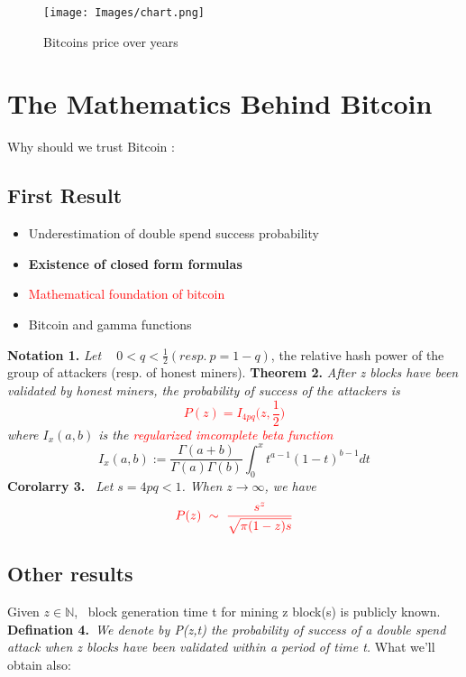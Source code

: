 \documentclass{article}
\begin{document}
    \begin{figure}[h]
        \centering
        \texttt{[image: Images/chart.png]}
        \caption{Bitcoins price over years}
    \end{figure}
    
\section{The Mathematics Behind Bitcoin}
Why should we trust Bitcoin :
    \subsection{First Result}
        \begin{itemize}
            \item Underestimation of double spend success probability
            \item \textbf{Existence of closed form formulas}
            \item \textcolor{red}{Mathematical foundation of bitcoin}
            \item Bitcoin and gamma functions
        \end{itemize}
\newpage
\textbf{Notation 1. } \textit{Let ~ $ 0 < q < \frac{1}{2} (resp.~ p=1-q) $}, the relative hash power of the group of attackers (resp. of honest miners).
\newline
\newline
\newline
\textbf{Theorem 2. } \textit{After z blocks have been validated by honest miners, the probability of success of the attackers is
        \textcolor{red}{$$ P(z)=I_{4pq} \Big( z,\frac{1}{2} \Big) $$}
    where $I_x(a, b)$ is the \textcolor{red}{ regularized imcomplete beta function}}
    \textit{
        \begin{equation}
            I_x(a,b) := \frac{\Gamma(a+b)}{\Gamma(a)\Gamma(b)}
        \int_{0}^{x} t^{a-1}(1-t)^{b-1}dt 
        \end{equation} 
    }
\newline
\newline
\textbf{Corolarry 3.} \textit{~Let $s=4pq<1$. When $z\to \infty$, we have
    \begin{equation}
        \textcolor{red}{
            P(z) ~ \sim ~ \frac{s^z}{\sqrt{\pi(1-z)s}}
        }
    \end{equation}
}

\subsection{Other results}
Given $z \in \mathbb{N}$,~ block generation time t for mining z block(s) is publicly known.
\newline
\newline
\newline
\textbf{Defination 4.}~\textit{We denote by P(z,t) the probability of success of a double spend attack when z blocks have been validated within a period of time t.}
\newline
\newline
What we'll obtain also:
\end{document}
